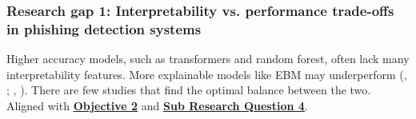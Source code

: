 
\subsubsection*{Research gap 1: Interpretability vs. performance trade-offs in phishing detection systems}\label{research-gap-1}
Higher accuracy models, such as transformers and random forest, often lack many interpretability features. More explainable models like EBM may underperform (\citeauthor{do2024integrated}, \citeyear{do2024integrated}; \citeauthor{greco2023explaining}, \citeyear{greco2023explaining}). There are few studies that find the optimal balance between the two. Aligned with \hyperref[objective-2]{\uline{\textbf{Objective 2}}} and \hyperref[sub-research-q4]{\uline{\textbf{Sub Research Question 4}}}.

